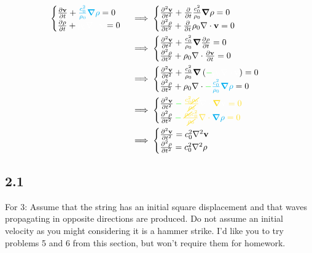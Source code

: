 \documentclass{article}
\begin{document}
\begin{align*}
  \begin{cases}\pdv{\vb{v}}{t} + {\color{cyan}\frac{c_0^2}{\rho_0}\grad{\rho}} = 0\\
  \pdv{\rho}{t} +{\color{white}\rho_0\nabla\cdot \vb{v}} = 0\end{cases}
  &\implies \begin{cases}\pdv[2]{\vb{v}}{t} + \pdv{}{t}\frac{c_0^2}{\rho_0}\grad{\rho} = 0\\
    \pdv[2]{\rho}{t} +\pdv{t}\rho_0\nabla\cdot \vb{v} = 0\end{cases}\\
  &\implies \begin{cases}\pdv[2]{\vb{v}}{t} + \frac{c_0^2}{\rho_0}\grad{\pdv{\rho}{t}} = 0\\
    \pdv[2]{\rho}{t} +\rho_0\nabla\cdot \pdv{\vb{v}}{t} = 0\end{cases}\\
&\implies \begin{cases}\pdv[2]{\vb{v}}{t} +
  \frac{c_0^2}{\rho_0}\grad{\left(  {\color{green} - \color{white} \rho_0\nabla\cdot \vb{v}}\right)} = 0\\
    \pdv[2]{\rho}{t} +\rho_0\nabla\cdot
    {\color{green}-\color{cyan}\frac{c_0^2}{\rho_0}\grad{\rho}} =
    0\end{cases}\\
  &\implies \begin{cases}\pdv[2]{\vb{v}}{t}  \color{green}
    -\color{Goldenrod} \frac{c_0^2\cancel{\rho_0}}{\cancel{\rho_0}} {\color{white}\nabla\cdot\color{Goldenrod}\grad{\color{white} \vb{v}}} = 0\\
    \pdv[2]{\rho}{t} \color{green}
    -\color{Goldenrod} \frac{\cancel{\rho_0}c_0^2}{\cancel{\rho_0}}
    {\color{cyan}\color{Goldenrod}\nabla \cdot\color{cyan} \grad{\rho}} =
    0\end{cases}\\
  &\implies \begin{cases}\pdv[2]{\vb{v}}{t} = c_0^2\laplacian{\vb{v}}\\
    \pdv[2]{\rho}{t} =c_0^2 \laplacian{\rho}\end{cases}\\
\end{align*}
\subsection*{2.1}
For 3: Assume that the string has an initial square displacement and that waves propagating
in opposite directions are produced. Do not assume an initial velocity as you might considering
it is a hammer strike.
I’d like you to try problems 5 and 6 from this section, but won’t require them for homework.
\end{document}
